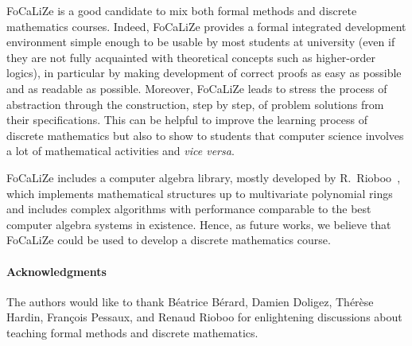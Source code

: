 \documentclass[submission,copyright,creativecommons]{eptcs}
\def\focalize{FoCaLiZe \mbox{}}
\begin{document}
\focalize is a good candidate to mix both formal
methods and discrete mathematics courses. Indeed,  \focalize provides
a formal integrated development environment simple enough to be 
usable by most students at university (even if they are not fully
acquainted with theoretical concepts such as 
higher-order logics), in particular by making development
of correct proofs as easy as possible and as readable  as possible.
Moreover, \focalize leads to stress the process of
abstraction through the construction, step by step, of problem
solutions from their specifications. This can be helpful
to improve the learning process of discrete mathematics but also to
show to students that
computer
science involves a lot of mathematical activities and {\it vice versa}.


\focalize includes a
computer algebra library, mostly developed by
R.~Rioboo~\cite{calc01,DBLP:journals/amai/Rioboo09}, which
implements mathematical structures up to multivariate 
polynomial rings and includes complex algorithms
with
performance comparable to the best computer algebra systems in
existence.
Hence, as future works, we believe that \focalize could be used 
to develop a discrete
mathematics course.










\paragraph{Acknowledgments}
The authors would like to thank B\'eatrice B\'erard, Damien Doligez, Th\'er\`ese Hardin,
Fran\c{c}ois Pessaux,  and Renaud Rioboo for enlightening discussions
about teaching formal methods and discrete mathematics.





\end{document}

